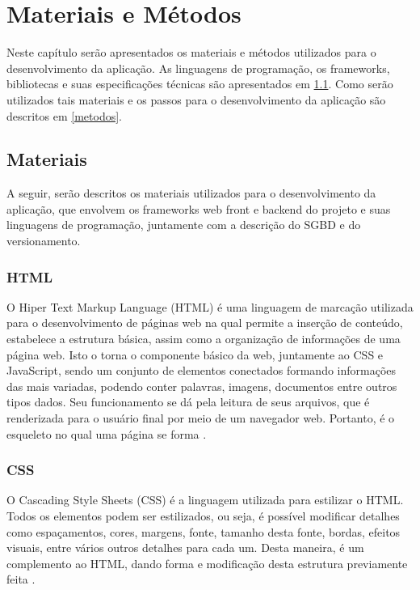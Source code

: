 \chapter{Materiais e Métodos}\label{chp:LABEL_CHP_3}
Neste capítulo serão apresentados os materiais e métodos utilizados para o desenvolvimento da aplicação. As linguagens de programação, os frameworks, bibliotecas e suas especificações técnicas são apresentados em \ref{materiais}. Como serão utilizados tais materiais e os passos para o desenvolvimento da aplicação são descritos em \ref{metodos}.

\section{Materiais} \label{materiais}
A seguir, serão descritos os materiais utilizados para o desenvolvimento da aplicação, que envolvem os frameworks web front e backend do projeto e suas linguagens de programação, juntamente com a descrição do SGBD e do versionamento.

\subsection{HTML}
O Hiper Text Markup Language (HTML) é uma linguagem de marcação utilizada para o desenvolvimento de páginas web na qual permite a inserção de conteúdo, estabelece a estrutura básica, assim como a organização de informações de uma página web. Isto o torna o componente básico da web, juntamente ao CSS e JavaScript, sendo um conjunto de elementos conectados formando informações das mais variadas, podendo conter palavras, imagens, documentos entre outros tipos dados. Seu funcionamento se dá pela leitura de seus arquivos, que é renderizada para o usuário final por meio de um navegador web. Portanto, é o esqueleto no qual uma página se forma \cite{FLANAGAN}.

\subsection{CSS}
O Cascading Style Sheets (CSS) é a linguagem utilizada para estilizar o HTML. Todos os elementos podem ser estilizados, ou seja, é possível modificar detalhes como espaçamentos, cores, margens, fonte, tamanho desta fonte, bordas, efeitos visuais, entre vários outros detalhes para cada um. Desta maneira, é um complemento ao HTML, dando forma e modificação desta estrutura previamente feita \cite{FLANAGAN}.

